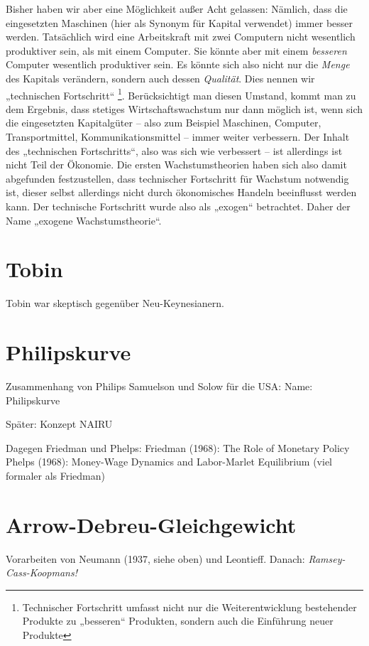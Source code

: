 Bisher haben wir aber eine Möglichkeit außer Acht gelassen: Nämlich, dass die eingesetzten Maschinen (hier als Synonym für Kapital verwendet) immer besser werden. Tatsächlich wird eine Arbeitskraft mit zwei Computern nicht wesentlich produktiver sein, als mit einem Computer. Sie könnte aber mit einem \textit{besseren} Computer wesentlich produktiver sein. Es könnte sich also nicht nur die \textit{Menge} des Kapitals verändern, sondern auch dessen \textit{Qualität}. Dies nennen wir „technischen Fortschritt“ \footnote{Technischer Fortschritt umfasst nicht nur die Weiterentwicklung bestehender Produkte zu „besseren“ Produkten, sondern auch die Einführung neuer Produkte}.
Berücksichtigt man diesen Umstand, kommt man zu dem Ergebnis, dass stetiges Wirtschaftswachstum nur dann möglich ist, wenn sich die eingesetzten Kapitalgüter – also zum Beispiel Maschinen, Computer, Transportmittel, Kommunikationsmittel – immer weiter verbessern.
Der Inhalt des „technischen Fortschritts“, also was sich wie verbessert – ist allerdings ist nicht Teil der Ökonomie. Die ersten Wachstumstheorien haben sich also damit abgefunden festzustellen, dass technischer Fortschritt für Wachstum notwendig ist, dieser selbst allerdings nicht durch ökonomisches Handeln beeinflusst werden kann. Der technische Fortschritt wurde also als „exogen“ betrachtet. Daher der Name „exogene Wachstumstheorie“.

\section{Tobin}

Tobin war skeptisch gegenüber Neu-Keynesianern. \textcite[S. 398]{Snowdon2005}

\section{Philipskurve} \label{sec: Phillips}

Zusammenhang von Philips
Samuelson und Solow für die USA: Name: Philipskurve


Später: Konzept NAIRU


Dagegen Friedman und Phelps:
Friedman (1968): The Role of Monetary Policy
Phelps (1968): Money-Wage Dynamics and Labor-Marlet Equilibrium (viel formaler als Friedman)








\section{Arrow-Debreu-Gleichgewicht}
\label{Arrow-Debreu}
Vorarbeiten von Neumann (1937, siehe oben) und Leontieff. Danach: \textit{Ramsey-Cass-Koopmans!}

